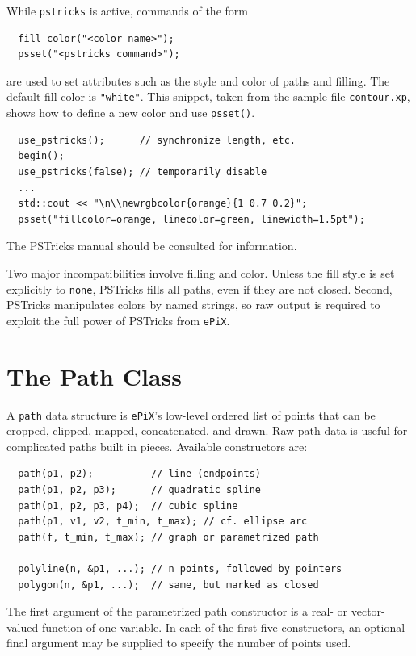 \documentclass[12pt]{report}
\newcommand{\code}[1]{\texttt{#1}}
\newcommand{\filename}[1]{\texttt{#1}}
\newcommand{\ePiX}{\code{ePiX}}
\begin{document}
While \code{pstricks} is active, commands of the form
\begin{verbatim}
  fill_color("<color name>");
  psset("<pstricks command>");
\end{verbatim}
are used to set attributes such as the style and color of paths and
filling. The default fill color is \code{"white"}.  This snippet,
taken from the sample file \filename{contour.xp}, shows how to define
a new color and use \code{psset()}.
\begin{verbatim}
  use_pstricks();      // synchronize length, etc.
  begin();
  use_pstricks(false); // temporarily disable
  ...
  std::cout << "\n\\newrgbcolor{orange}{1 0.7 0.2}";
  psset("fillcolor=orange, linecolor=green, linewidth=1.5pt");
\end{verbatim}
The PSTricks manual should be consulted for information.

Two major incompatibilities involve filling and color. Unless the
fill style is set explicitly to \code{none}, PSTricks fills all paths,
even if they are not closed. Second, PSTricks manipulates colors by
named strings, so raw output is required to exploit the full power of
PSTricks from \ePiX.


\section{The Path Class}

A \code{path} data structure is \ePiX's low-level ordered list of
points that can be cropped, clipped, mapped, concatenated, and drawn.
Raw path data is useful for complicated paths built in pieces.
Available constructors are:
\begin{verbatim}
  path(p1, p2);          // line (endpoints)
  path(p1, p2, p3);      // quadratic spline
  path(p1, p2, p3, p4);  // cubic spline
  path(p1, v1, v2, t_min, t_max); // cf. ellipse arc
  path(f, t_min, t_max); // graph or parametrized path

  polyline(n, &p1, ...); // n points, followed by pointers
  polygon(n, &p1, ...);  // same, but marked as closed
\end{verbatim}
The first argument of the parametrized path constructor is a real- or
vector-valued function of one variable. In each of the first five
constructors, an optional final argument may be supplied to specify
the number of points used.
\end{document}
